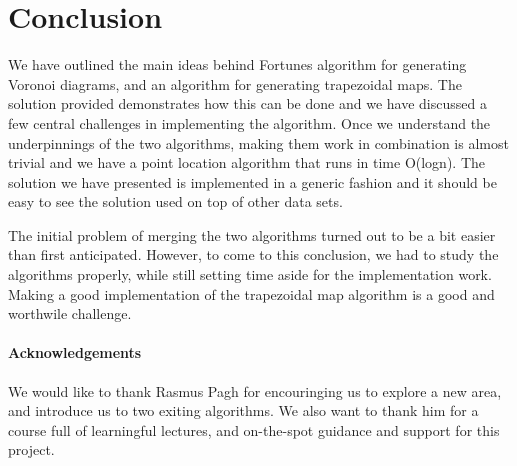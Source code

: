 \section{Conclusion}
We have outlined the main ideas behind Fortunes algorithm for generating Voronoi diagrams, and an algorithm for generating trapezoidal maps. The solution provided demonstrates how this can be done and we have discussed a few central challenges in implementing the algorithm. Once we understand the underpinnings of the two algorithms, making them work in combination is almost trivial and we have a point location algorithm that runs in time O(logn). The solution we have presented is implemented in a generic fashion and it should be easy to see the solution used on top of other data sets.

The initial problem of merging the two algorithms turned out to be a bit easier than first anticipated. However, to come to this conclusion, we had to study the algorithms properly, while still setting time aside for the implementation work. Making a good implementation of the trapezoidal map algorithm is a good and worthwile challenge.  
\paragraph{Acknowledgements}
We would like to thank Rasmus Pagh for encouringing us to explore a new area, and introduce us to two exiting algorithms. We also want to thank him for a course full of learningful lectures, and on-the-spot guidance and support for this project.  
